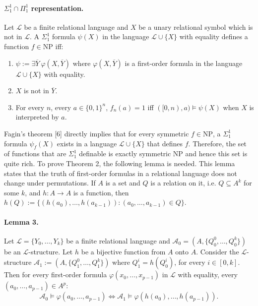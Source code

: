 \paragraph{$\Sigma_1^1\cap\Pi_1^1$ representation.} Let $\mathcal L$ be a finite relational language and $X$ be a unary relational symbol which is not in $\mathcal L$. A $\Sigma_1^1$ formula $\psi(X)$ in the language $\mathcal L\cup\{X\}$ with equality defines a function $f\in\mathrm{NP}$ iff:
\begin{enumerate}
\item $\psi:=\exists\overline Y\ \varphi(X,\overline Y)$ where $\varphi(X,\overline Y)$ is a first-order formula in the language $\mathcal L\cup\{X\}$ with equality.
\item $X$ is not in $\overline Y$.
\item For every $n$, every $a\in\{0,1\}^n$, $f_n(a)=1$ iff $([0,n),a)\models\psi(X)$ when $X$ is interpreted by $a$.
\end{enumerate}
Fagin's theorem [6] directly implies that for every symmetric $f\in\mathrm{NP}$, a $\Sigma_1^1$ formula $\psi_f(X)$ exists in a language $\mathcal L\cup\{X\}$ that defines $f$. Therefore, the set of functions that are $\Sigma_1^1$ definable is exactly symmetric NP and hence this set is quite rich.
To prove Theorem 2, the following lemma is needed. This lemma states that the truth of first-order formulas in a relational language does not change under permutations.
If $A$ is a set and $Q$ is a relation on it, i.e. $Q\subseteq A^k$ for some $k$, and $h:A\to A$ is a function, then $h(Q):=\{(h(a_0),\ldots,h(a_{k-1})):(a_0,\ldots,a_{k-1})\in Q\}$.
\paragraph{Lemma 3.} Let $\mathcal L=\{Y_0,\ldots,Y_k\}$ be a finite relational language and $\mathcal A_0=(A,\{Q_0^0,\ldots,Q_0^k\})$ be an $\mathcal L$-structure. Let $h$ be a bijective function from $A$ onto $A$. Consider the $\mathcal L$-structure $\mathcal A_1:=(A,\{Q_1^0,\ldots,Q_1^k\})$ where $Q_1^i=h(Q_0^i)$, for every $i\in[0,k]$. Then for every first-order formula $\varphi(x_0,\ldots,x_{p-1})$ in $\mathcal L$ with equality, every $(a_0,\ldots,a_{p-1})\in A^p$:
\[\mathcal A_0\models\varphi(a_0,\ldots,a_{p-1})\Longleftrightarrow\mathcal A_1\models\varphi(h(a_0),\ldots,h(a_{p-1})).\]
